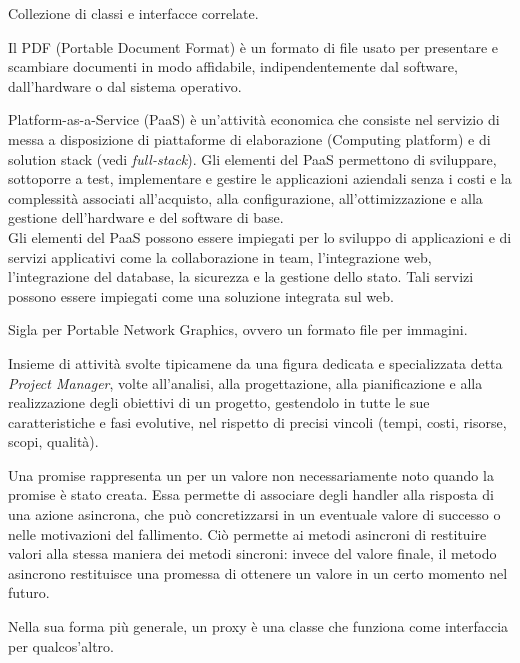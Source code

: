Collezione di classi e interfacce correlate.

Il PDF (Portable Document Format) è un formato di file usato per presentare e scambiare documenti in modo affidabile, indipendentemente dal software, dall'hardware o dal sistema operativo.

Platform-as-a-Service (PaaS) è un'attività economica che consiste nel servizio di messa a disposizione di piattaforme di elaborazione (Computing platform) e di solution stack (vedi \textit{full-stack}). Gli elementi del PaaS permettono di sviluppare, sottoporre a test, implementare e gestire le applicazioni aziendali senza i costi e la complessità associati all'acquisto, alla configurazione, all'ottimizzazione e alla gestione dell'hardware e del software di base.\\
Gli elementi del PaaS possono essere impiegati per lo sviluppo di applicazioni e di servizi applicativi come la collaborazione in team, l'integrazione web, l'integrazione del database, la sicurezza e la gestione dello stato. Tali servizi possono essere impiegati come una soluzione integrata sul web.

Sigla per Portable Network Graphics, ovvero un formato file per immagini.

Insieme di attività svolte tipicamene da una figura dedicata e specializzata detta \textit{Project Manager}, volte all'analisi, alla progettazione, alla pianificazione e alla realizzazione degli obiettivi di un progetto, gestendolo in tutte le sue caratteristiche e fasi evolutive, nel rispetto di precisi vincoli (tempi, costi, risorse, scopi, qualità).

Una promise rappresenta un  per un valore non necessariamente noto quando la promise è stato creata. Essa permette di associare degli handler alla risposta di una azione asincrona, che può concretizzarsi in un eventuale valore di successo o nelle motivazioni del fallimento. Ciò permette ai metodi asincroni di restituire valori alla stessa maniera dei metodi sincroni: invece del valore finale, il metodo asincrono restituisce una promessa di ottenere un valore in un certo momento nel futuro.

Nella sua forma più generale, un proxy è una classe che funziona come interfaccia per qualcos'altro.
\clearpage